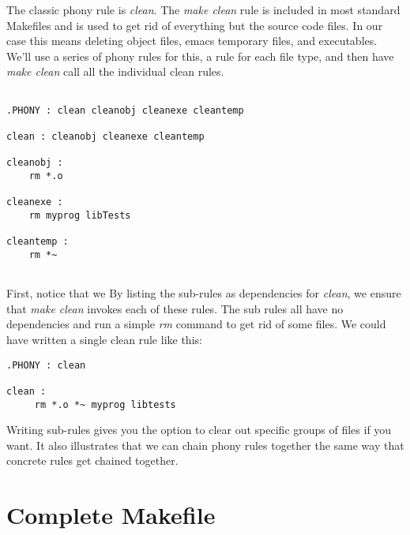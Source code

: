 \documentclass[]{tufte-handout}
\begin{document}
The classic phony rule is \textit{clean}.  The \textit{make clean} rule is included in most standard Makefiles and is used to get rid of everything but the source code files.  In our case this means deleting object files, emacs temporary files, and executables.  We'll use a series of phony rules for this, a rule for each file type, and then have \textit{make clean} call all the individual clean rules.  
\begin{verbatim}

.PHONY : clean cleanobj cleanexe cleantemp

clean : cleanobj cleanexe cleantemp

cleanobj : 
    rm *.o

cleanexe : 
    rm myprog libTests

cleantemp :
    rm *~
    
\end{verbatim}
First, notice that we By listing the sub-rules as dependencies for \textit{clean}, we ensure that \textit{make clean} invokes each of these rules.  The sub rules all have no dependencies and run a simple \textit{rm} command to get rid of some files.  We could have written a single clean rule like this:
\begin{verbatim}
.PHONY : clean

clean : 
     rm *.o *~ myprog libtests
\end{verbatim}
Writing sub-rules gives you the option to clear out specific groups of files if you want. It also illustrates that we can chain phony rules together the same way that concrete rules get chained together.

\newpage
\section{Complete Makefile}
\end{document}
